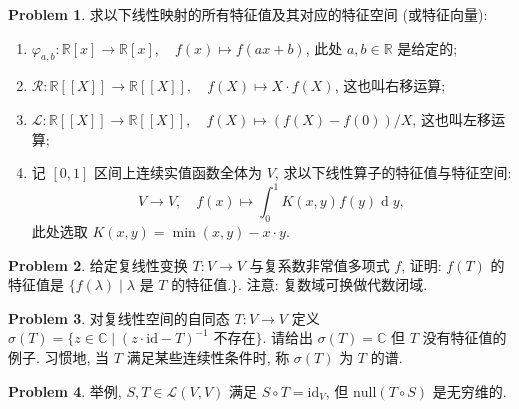 \documentclass{MainStyle}
\theoremstyle{definition}
\newtheorem{problem}{Problem}
\begin{document}
\begin{problem}
求以下线性映射的所有特征值及其对应的特征空间 (或特征向量):
\begin{enumerate}
    \item $\varphi_{a,b}:\mathbb R[x]\to \mathbb R[x],\quad f(x)\mapsto f(ax+b)$, 此处 $a,b\in \mathbb R$ 是给定的;
    \item $\mathcal R:\mathbb R[\![X]\!]\to \mathbb R[\![X]\!],\quad f(X)\mapsto X\cdot f(X)$, 这也叫右移运算;
    \item $\mathcal L:\mathbb R[\![X]\!]\to \mathbb R[\![X]\!],\quad f(X)\mapsto  (f(X)-f(0))/X$, 这也叫左移运算;
    \item 记 $[0,1]$ 区间上连续实值函数全体为 $V$, 求以下线性算子的特征值与特征空间:
          \begin{equation}
              V\to V,\quad f(x)\mapsto \int_0^1 K(x,y)f(y)\operatorname dy,
          \end{equation}
          此处选取 $K(x,y)=\min(x,y)-x\cdot y$.
\end{enumerate}
\end{problem}

\begin{problem}
给定复线性变换 $T:V\to V$ 与复系数非常值多项式 $f$, 证明: $f(T)$ 的特征值是 $\{f(\lambda)\mid \lambda \text{ 是 }T\text{ 的特征值.}\}$. 注意: 复数域可换做代数闭域.
\end{problem}

\begin{problem}
对复线性空间的自同态 $T:V\to V$ 定义 $\sigma(T)=\{z\in \mathbb C\mid (z\cdot\mathrm{id}-T)^{-1}\text{ 不存在}\}$. 请给出 $\sigma(T)=\mathbb C$ 但 $T$ 没有特征值的例子. 习惯地, 当 $T$ 满足某些连续性条件时, 称 $\sigma(T)$ 为 $T$ 的谱.
\end{problem}

\begin{problem}
举例, $S,T\in \mathcal L(V,V)$ 满足 $S\circ T= \mathrm{id}_V$, 但 $\mathrm{null}(T\circ S)$ 是无穷维的.
\end{problem}
\end{document}
